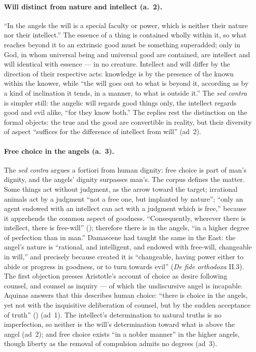 \paragraph{Will distinct from nature and intellect (a.~2).} ``In the
angels the will is a special faculty or power, which is neither their
nature nor their intellect.'' The essence of a thing is contained wholly
within it, so what reaches beyond it to an extrinsic good must be
something superadded; only in God, in whom universal being and universal
good are contained, are intellect and will identical with essence --- in
no creature. Intellect and will differ by the direction of their
respective acts: knowledge is by the presence of the known within the
knower, while ``the will goes out to what is beyond it, according as by
a kind of inclination it tends, in a manner, to what is outside it.''
The \emph{sed contra} is simpler still: the angelic will regards good
things only, the intellect regards good and evil alike, ``for they know
both.'' The replies rest the distinction on the formal objects: the true
and the good are convertible in reality, but their diversity of aspect
``suffices for the difference of intellect from will'' (ad~2).

\paragraph{Free choice in the angels (a.~3).} The \emph{sed contra}
argues a fortiori from human dignity: free choice is part of man's
dignity, and the angels' dignity surpasses man's. The corpus defines the
matter. Some things act without judgment, as the arrow toward the
target; irrational animals act by a judgment ``not a free one, but
implanted by nature''; ``only an agent endowed with an intellect can act
with a judgment which is free,'' because it apprehends the common aspect
of goodness. ``Consequently, wherever there is intellect, there is
free-will'' ();
therefore there is  in the angels, ``in a
higher degree of perfection than in man.'' Damascene had taught the same
in the East: the angel's nature is ``rational, and intelligent, and
endowed with free-will, changeable in will,'' and precisely because
created it is ``changeable, having power either to abide or progress in
goodness, or to turn towards evil'' (\emph{De fide orthodoxa} II.3). The
first objection presses Aristotle's account of choice as desire
following counsel, and counsel as inquiry --- of which the undiscursive
angel is incapable. Aquinas answers that this describes human choice:
``there is choice in the angels, yet not with the inquisitive
deliberation of counsel, but by the sudden acceptance of truth''
() (ad~1). The intellect's
determination to natural truths is no imperfection, so neither is the
will's determination toward what is above the angel (ad~2); and free
choice exists ``in a nobler manner'' in the higher angels, though liberty
as the removal of compulsion admits no degrees (ad~3).

